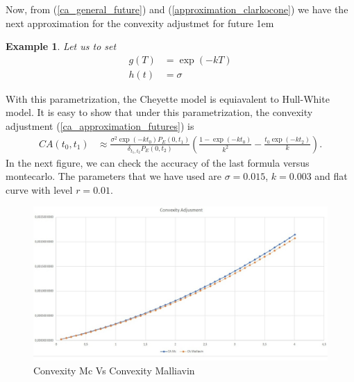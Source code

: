\documentclass[a4paper,10pt]{article}
\newtheorem{example}[theorem]{Example}
\newcommand{\1}{\mathbf{1}}
\begin{document}
Now, from (\ref{ca_general_future}) and (\ref{approximation_clarkocone}) we have the next approximation for the convexity adjustmet for future
\hspace{1cm}
\fboxsep1em

\begin{example}\label{example_ca_future}
Let us to set 
\begin{align*}
g(T) &= \exp(-kT) \\
h(t) &= \sigma
\end{align*}
\end{example}
With this parametrization, the Cheyette model is equiavalent to Hull-White model. It is easy to show that under this parametrization, the convexity adjustment (\ref{ca_approximation_futures}) is
\begin{align*}
CA(t_0,t_1) & \approx \frac{\sigma^{2} \exp(-k t_0)  P_{E}(0,t_1)}{\delta_{t_1,t_2} P_{E}(0,t_2)} \left(\frac{1 - \exp(- k t_0)}{k^{2}} - \frac{t_0 \exp(-k t_2)}{k} \right).   
\end{align*}
In the next figure, we can check the accuracy of the last formula versus montecarlo. The parameters that we have used are $\sigma=0.015$, $k=0.003$ and flat curve with level $r=0.01$.

\begin{figure}[h]
	\begin{center}
		\includegraphics[scale=0.3]{Figures/future_convexity.jpg}
		\caption{Convexity Mc Vs Convexity Malliavin}
	\end{center}
\end{figure} 
\end{document}

